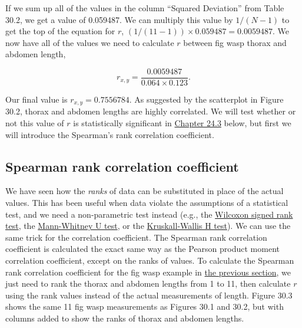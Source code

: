 \documentclass[
  openany]{scrbook}
\begin{document}
If we sum up all of the values in the column ``Squared Deviation'' from Table 30.2, we get a value of 0.059487.
We can multiply this value by \(1 / (N - 1)\) to get the top of the equation for \(r\), \((1 / (11-1)) \times 0.059487 = 0.0059487\).
We now have all of the values we need to calculate \(r\) between fig wasp thorax and abdomen length,

\[r_{x,y} = \frac{0.0059487}{0.064 \times 0.123}.\]

Our final value is \(r_{x, y} = 0.7556784\).
As suggested by the scatterplot in Figure 30.2, thorax and abdomen lengths are highly correlated.
We will test whether or not this value of \(r\) is statistically significant in \protect\hyperlink{correlation-hypothesis-testing}{Chapter 24.3} below, but first we will introduce the Spearman's rank correlation coefficient.

\hypertarget{spearman-rank-correlation-coefficient}{%
\subsection{Spearman rank correlation coefficient}\label{spearman-rank-correlation-coefficient}}

We have seen how the \emph{ranks} of data can be substituted in place of the actual values.
This has been useful when data violate the assumptions of a statistical test, and we need a non-parametric test instead (e.g., the \protect\hyperlink{wilcoxon-test-1}{Wilcoxon signed rank test}, the \protect\hyperlink{mann-whitney-u-test-1}{Mann-Whitney U test}, or the \protect\hyperlink{Chapter_26}{Kruskall-Wallis H test}).
We can use the same trick for the correlation coefficient.
The Spearman rank correlation coefficient is calculated the exact same way as the Pearson product moment correlation coefficient, except on the ranks of values.
To calculate the Spearman rank correlation coefficient for the fig wasp example in \protect\hyperlink{pearson-product-moment-correlation-coefficient}{the previous section}, we just need to rank the thorax and abdomen lengths from 1 to 11, then calculate \(r\) using the rank values instead of the actual measurements of length.
Figure 30.3 shows the same 11 fig wasp measurements as Figures 30.1 and 30.2, but with columns added to show the ranks of thorax and abdomen lengths.
\end{document}
